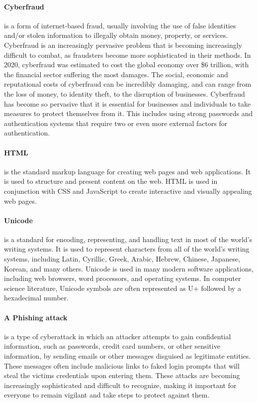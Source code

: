 \documentclass[12pt]{scrbook}
\begin{document}
\paragraph{Cyberfraud} is a form of internet-based fraud, usually involving the use of false identities and/or stolen information to illegally obtain money, property, or services.
Cyberfraud is an increasingly pervasive problem that is becoming increasingly
difficult to combat, as fraudsters become more sophisticated in their methods.
In 2020, cyberfraud was estimated to cost the global economy over \$6
trillion\cite{6trillion}, with the financial sector suffering the most damages.
The social, economic and reputational costs of cyberfraud can be incredibly
damaging, and can range from the loss of money, to identity theft, to the
disruption of businesses. Cyberfraud has become so pervasive that it is
essential for businesses and individuals to take measures to protect themselves
from it. This includes using strong passwords and authentication systems that require
two or even more external factors for authentication.

\paragraph{HTML} is the standard markup language for creating web pages
and web applications. It is used to structure and present content on the web.
HTML is used in conjunction with CSS and JavaScript to create interactive and
visually appealing web pages.

\paragraph{Unicode} is a standard for encoding,
representing, and handling text in most of the world's writing systems. It is
used to represent characters from all of the world's writing systems, including
Latin, Cyrillic, Greek, Arabic, Hebrew, Chinese, Japanese, Korean, and many
others. Unicode is used in many modern software applications, including web
browsers, word processors, and operating systems. In computer science
literature, Unicode symbols are often represented as U+ followed by a
hexadecimal number.

\paragraph{A Phishing attack} is a type of cyberattack in which an attacker attempts to gain
confidential information, such as passwords, credit card numbers, or other
sensitive information, by sending emails or other messages disguised as
legitimate entities. These messages often include malicious links to faked login
prompts that will steal the victims credentials upon entering them. These
attacks are becoming increasingly sophisticated and difficult to recognize,
making it important for everyone to remain vigilant and take steps to protect
against them.
\end{document}

